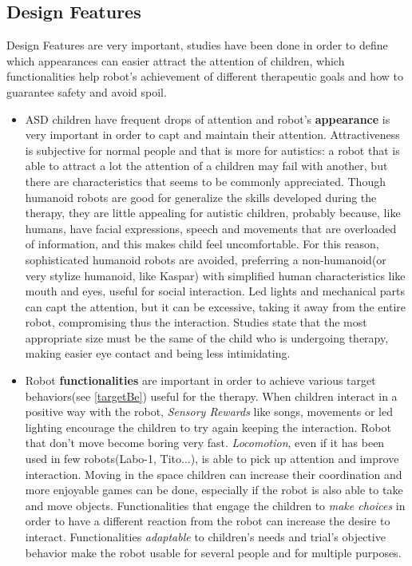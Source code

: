 \subsection{Design Features}
\label{designF}
Design Features are very important, studies have been done in order to define which appearances can easier attract the attention of children, which functionalities help robot's achievement of different therapeutic goals and how to guarantee safety and avoid spoil. 

\begin{itemize}
	\item ASD children have frequent drops of attention and robot's \textbf{appearance} is very important in order to capt and maintain their attention. Attractiveness is subjective for normal people and that is more for autistics: a robot that is able to attract a lot the attention of a children may fail with another, but there are characteristics that seems to be commonly appreciated. Though humanoid robots are good for generalize the skills developed during the therapy, they are little appealing for autistic children, probably because, like humans, have facial expressions, speech and movements that are overloaded of information, and this makes child feel uncomfortable. For this reason, sophisticated humanoid robots are avoided, preferring a non-humanoid(or very stylize humanoid, like Kaspar) with simplified human characteristics like mouth and eyes, useful for social interaction. Led lights and mechanical parts can capt the attention, but it can be excessive, taking it away from the entire robot, compromising thus the interaction. Studies state that the most appropriate size must be the same of the child who is undergoing therapy, making easier eye contact and being less intimidating. 
	 
	\item Robot \textbf{functionalities} are important in order to achieve various target behaviors(see \ref{targetBe}) useful for the therapy. When children interact in a positive way with the robot, \textit{Sensory Rewards} like songs, movements or led lighting encourage the children to try again keeping the interaction. Robot that don't move become boring very fast. \textit{Locomotion}, even if it has been used in few robots(Labo-1, Tito...), is able to pick up attention and improve interaction. Moving in the space children can increase their coordination and more enjoyable games can be done, especially if the robot is also able to take and move objects. Functionalities that engage the children to \textit{make choices} in order to have a different reaction from the robot can increase the desire to interact. Functionalities \textit{adaptable} to children's needs and trial's objective behavior make the robot usable for several people and for multiple purposes.
	

\end{itemize}

